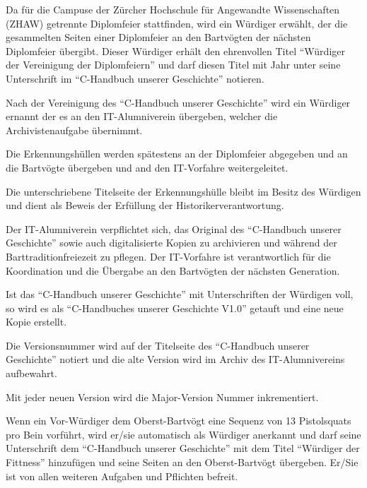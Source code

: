 \documentclass[fontsize=12pt,parskip=half]{scrartcl}
\begin{document}
\begin{contract}
  Da für die Campuse der Zürcher Hochschule für Angewandte Wissenschaften (ZHAW) getrennte Diplomfeier stattfinden, wird ein Würdiger erwählt, der die gesammelten
  Seiten einer Diplomfeier an den Bartvögten der nächsten Diplomfeier übergibt. Dieser Würdiger erhält den ehrenvollen Titel ``Würdiger der Vereinigung der Diplomfeiern'' und darf
  diesen Titel mit Jahr unter seine Unterschrift im ``C-Handbuch unserer Geschichte'' notieren.

  Nach der Vereinigung des ``C-Handbuch unserer Geschichte'' wird ein Würdiger ernannt der es an den IT-Alumniverein übergeben, welcher die Archivistenaufgabe  übernimmt.

  Die Erkennungshüllen werden spätestens an der Diplomfeier abgegeben und an die Bartvögte übergeben und and den IT-Vorfahre weitergeleitet.

  Die unterschriebene Titelseite der Erkennungshülle bleibt im Besitz des Würdigen und dient als Beweis der Erfüllung der Historikerverantwortung.

  \Clause[title={Archivistenaufgabe}]\label{H.archivistenaufgabe}
  Der IT-Alumniverein verpflichtet sich, das Original des ``C-Handbuch unserer Geschichte'' sowie auch digitalisierte Kopien zu archivieren und während der Barttraditionfreiezeit
  zu pflegen. Der IT-Vorfahre ist verantwortlich für die Koordination und die Übergabe an den Bartvögten der nächsten Generation.

  Ist das ``C-Handbuch unserer Geschichte'' mit Unterschriften der Würdigen voll, so wird es als ``C-Handbuches unserer Geschichte V1.0'' getauft und eine neue Kopie erstellt.

  Die Versionsnummer wird auf der Titelseite des ``C-Handbuch unserer Geschichte'' notiert und die alte Version wird im Archiv des IT-Alumnivereins aufbewahrt.

  Mit jeder neuen Version wird die Major-Version Nummer inkrementiert.

  \Clause[title={Fittnessklausel}]
  Wenn ein Vor-Würdiger dem Oberst-Bartvögt eine Sequenz von 13 Pistolsquats pro Bein vorführt, wird er/sie automatisch als Würdiger anerkannt und darf seine Unterschrift
  dem ``C-Handbuch unserer Geschichte'' mit dem Titel ``Würdiger der Fittness'' hinzufügen und seine Seiten an den Oberst-Bartvögt übergeben. Er/Sie ist von allen weiteren
  Aufgaben und Pflichten befreit.

\end{contract}

\pagebreak
\end{document}

